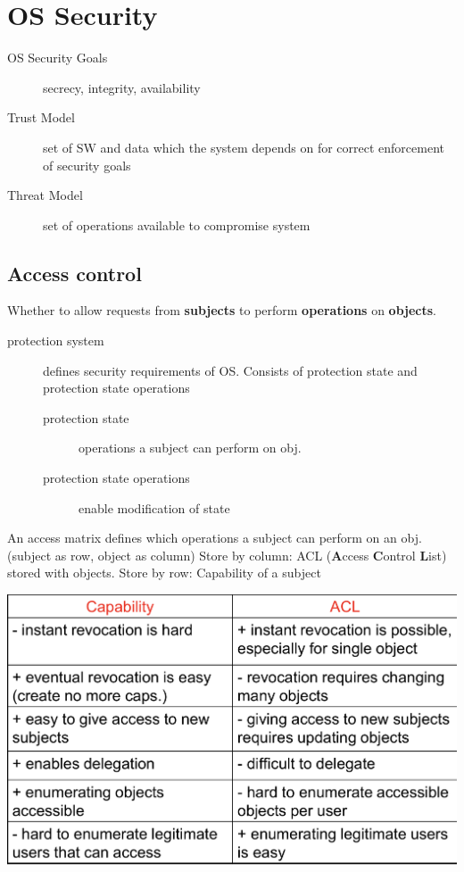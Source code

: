 \section{OS Security}

\begin{description}
    \item[OS Security Goals] secrecy, integrity, availability
    \item[Trust Model] set of SW and data which the system depends on for correct enforcement of security goals
    \item[Threat Model] set of operations available to compromise system
\end{description}

\subsection{Access control}
Whether to allow requests from \textbf{subjects} to perform \textbf{operations} on \textbf{objects}.

\begin{description}
    \item[protection system] defines security requirements of OS. Consists of protection state and protection state operations
        \begin{description}
            \item[protection state] operations a subject can perform on obj.
            \item[protection state operations] enable modification of state
        \end{description}
\end{description}

An access matrix defines which operations a subject can perform on an obj. (subject as row, object as column)
Store by column: ACL (\textbf{A}ccess \textbf{C}ontrol \textbf{L}ist) stored with objects.
Store by row: Capability of a subject
\begin{center}
    \includegraphics[width=0.65\linewidth]{images/os_sec_capabilities-vs-ACLs.png}
\end{center}

